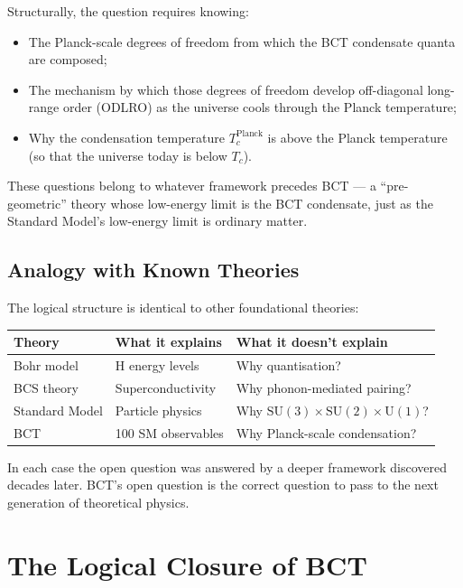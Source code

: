 \documentclass[11pt,a4paper]{article}
\theoremstyle{bctthm}
\theoremstyle{definition}
\begin{document}
Structurally, the question requires knowing:
\begin{itemize}
\item The Planck-scale degrees of freedom from which the BCT condensate
quanta are composed;
\item The mechanism by which those degrees of freedom develop
off-diagonal long-range order (ODLRO) as the universe cools through
the Planck temperature;
\item Why the condensation temperature $T_c^\mathrm{Planck}$ is above
the Planck temperature (so that the universe today is below $T_c$).
\end{itemize}
These questions belong to whatever framework precedes BCT —
a ``pre-geometric'' theory whose low-energy limit is the BCT condensate,
just as the Standard Model's low-energy limit is ordinary matter.

\subsection{Analogy with Known Theories}

The logical structure is identical to other foundational theories:

\begin{center}
\renewcommand{\arraystretch}{1.35}
\begin{tabular}{lll}
\toprule
Theory & What it explains & What it doesn't explain \\
\midrule
Bohr model & H energy levels & Why quantisation? \\
BCS theory & Superconductivity & Why phonon-mediated pairing? \\
Standard Model & Particle physics & Why $\mathrm{SU}(3)\times\mathrm{SU}(2)\times\mathrm{U}(1)$? \\
BCT & 100 SM observables & Why Planck-scale condensation? \\
\bottomrule
\end{tabular}
\end{center}

In each case the open question was answered by a deeper framework
discovered decades later. BCT's open question is the correct question
to pass to the next generation of theoretical physics.

\section{The Logical Closure of BCT}
\end{document}
